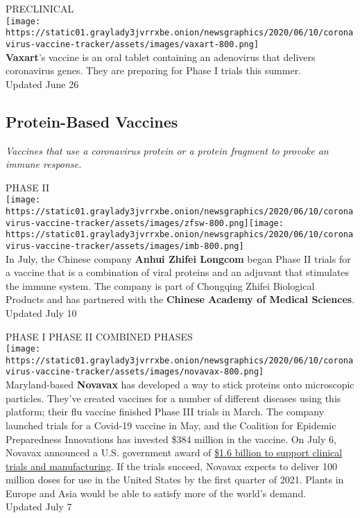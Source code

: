 PRECLINICAL\\
\texttt{[image: https://static01.graylady3jvrrxbe.onion/newsgraphics/2020/06/10/coronavirus-vaccine-tracker/assets/images/vaxart-800.png]}\\
\textbf{Vaxart}'s vaccine is an oral tablet containing an adenovirus
that delivers coronavirus genes. They are preparing for Phase I trials
this summer.\\
Updated June 26

\hypertarget{protein-based-vaccines}{%
\subsection{\texorpdfstring{\textbf{Protein-Based
Vaccines}}{Protein-Based Vaccines}}\label{protein-based-vaccines}}

\emph{Vaccines that use a coronavirus protein or a protein fragment to
provoke an immune response.}

PHASE II\\
\texttt{[image: https://static01.graylady3jvrrxbe.onion/newsgraphics/2020/06/10/coronavirus-vaccine-tracker/assets/images/zfsw-800.png]}\texttt{[image: https://static01.graylady3jvrrxbe.onion/newsgraphics/2020/06/10/coronavirus-vaccine-tracker/assets/images/imb-800.png]}\\
In July, the Chinese company \textbf{Anhui Zhifei Longcom} began Phase
II trials for a vaccine that is a combination of viral proteins and an
adjuvant that stimulates the immune system. The company is part of
Chongqing Zhifei Biological Products and has partnered with the
\textbf{Chinese Academy of Medical Sciences}.\\
Updated July 10

PHASE I PHASE II COMBINED PHASES\\
\texttt{[image: https://static01.graylady3jvrrxbe.onion/newsgraphics/2020/06/10/coronavirus-vaccine-tracker/assets/images/novavax-800.png]}\\
Maryland-based \textbf{Novavax} has developed a way to stick proteins
onto microscopic particles. They've created vaccines for a number of
different diseases using this platform; their flu vaccine finished Phase
III trials in March. The company launched trials for a Covid-19 vaccine
in May, and the Coalition for Epidemic Preparedness Innovations has
invested \$384 million in the vaccine. On July 6, Novavax announced a
U.S. government award of
\href{https://www.nytimes3xbfgragh.onion/2020/07/07/health/novavax-coronavirus-vaccine-warp-speed.html}{\$1.6
billion to support clinical trials and manufacturing}. If the trials
succeed, Novavax expects to deliver 100 million doses for use in the
United States by the first quarter of 2021. Plants in Europe and Asia
would be able to satisfy more of the world's demand.\\
Updated July 7

